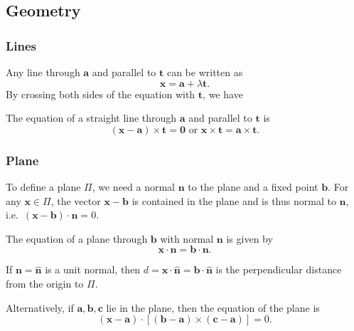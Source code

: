 \documentclass[a4paper]{article}
\begin{document}
\subsection{Geometry}
\subsubsection{Lines}
Any line through $\mathbf{a}$ and parallel to $\mathbf{t}$ can be written as
\[
  \mathbf{x} = \mathbf{a} + \lambda\mathbf{t}.
\]
By crossing both sides of the equation with $\mathbf{t}$, we have
\begin{thm} The equation of a straight line through $\mathbf{a}$ and parallel to $\mathbf{t}$ is
  \[
    \mathbf{(x - a)\times t = 0}\text{ or }\mathbf{x\times t = a\times t}.
  \]
\end{thm}
\subsubsection{Plane}
To define a plane $\Pi$, we need a normal $\mathbf{n}$ to the plane and a fixed point $\mathbf{b}$. For any $\mathbf{x}\in \Pi$, the vector $\mathbf{x - b}$ is contained in the plane and is thus normal to $\mathbf{n}$, i.e.\ $\mathbf{(x - b)\cdot n} = 0$.
\begin{thm}
  The equation of a plane through $\mathbf{b}$ with normal $\mathbf{n}$ is given by
  \[
    \mathbf{x\cdot n = b\cdot n}.
  \]
\end{thm}
If $\mathbf{n = \hat n}$ is a unit normal, then $d = \mathbf{x\cdot\hat{n} = b\cdot\hat{n}}$ is the perpendicular distance from the origin to $\Pi$.

Alternatively, if $\mathbf{a, b, c}$ lie in the plane, then the equation of the plane is
\[
  \mathbf{(x - a)\cdot [(b - a)\times (c - a)]} = 0.
\]
\end{document}
